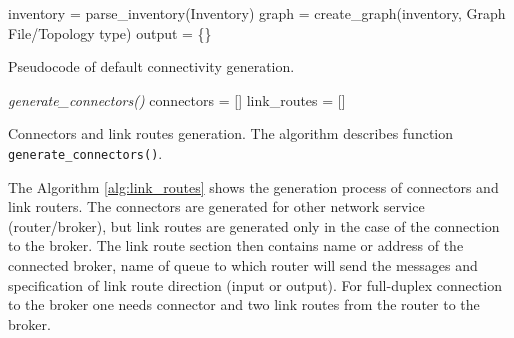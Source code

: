\begin{center}
	\begin{algorithm}[H]
		\LinesNumbered
		\DontPrintSemicolon


		\var inventory = parse\_inventory(Inventory)\;
		\var graph = create\_graph(inventory, Graph File/Topology type)\;
		\var output = \{\}\;

		 \caption{Pseudocode of default connectivity generation.}
		 \label{alg:default_connections}
	\end{algorithm}
\end{center}

\begin{center}
	\begin{algorithm}[H]
		\LinesNumbered
		\DontPrintSemicolon


		\fce \emph{generate\_connectors()}\;
		\var connectors = []\;
		\var link\_routes = []\;

		 \caption{Connectors and link routes generation. The algorithm describes function \texttt{generate\_connectors()}.}
		 \label{alg:link_routes}
	\end{algorithm}
\end{center}

The Algorithm \ref{alg:link_routes} shows the generation process of connectors and link routers. The connectors are generated for other network service (router/broker), but link routes are generated only in the case of the connection to the broker. The link route section then contains name or address of the connected broker, name of queue to which router will send the messages and specification of link route direction (input or output). For full-duplex connection to the broker one needs connector and two link routes from the router to the broker.

